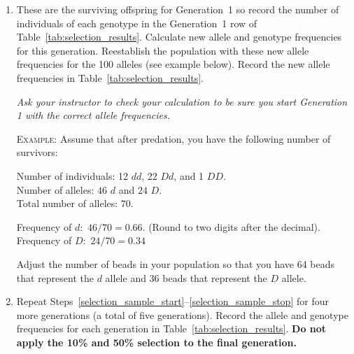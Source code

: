 \documentclass[12pt, hidelinks]{exam}
\newcommand{\allele}[1]{$#1$}
\begin{document}
\begin{questions}
\begin{enumerate}
	
	\item \label{selection_sample_stop} These are the surviving offspring for Generation~1 so record the number of individuals of each genotype in the Generation~1 row of Table~\ref{tab:selection_results}. Calculate new allele  and genotype frequencies for this generation. Reestablish the population with these new allele frequencies for the 100 alleles (see example below). Record the new allele frequencies in Table~\ref{tab:selection_results}.
	
	\textit{Ask your instructor to check your calculation to be sure you start Generation 1 with the correct allele frequencies.}
	
	\textsc{Example:} Assume that after predation, you have the following number of survivors:
	
	Number of individuals: 12 \allele{dd}, 22 \allele{Dd}, and 1 \allele{DD}.\\
	Number of alleles: $46$ \allele{d} and $24$ \allele{D}.\\
	Total number of alleles: $70$.

	Frequency of \allele{d:} $46/70 = 0.66$. (Round to two digits after the decimal).\\
	Frequency of \allele{D:} $24/70 = 0.34$ 

	Adjust the number of beads in your population so that you have 64 beads that represent the \allele{d} allele and 36 beads that represent the \allele{D} allele.  
	
	\item Repeat Steps~\ref{selection_sample_start}–\ref{selection_sample_stop} for four more generations (a total of five generations). Record the allele and genotype frequencies for each generation in Table~\ref{tab:selection_results}. \textbf{Do not apply the 10\% and 50\% selection to the final generation.}
	
\end{enumerate}


\end{questions}
\end{document}
